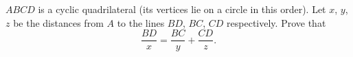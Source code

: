 $ABCD$ is a cyclic quadrilateral (its vertices lie on a circle in this order). Let $x$, $y$, $z$ be the distances from $A$ to the lines $BD$, $BC$, $CD$ respectively. Prove that
\[\dfrac{BD}{x}=\dfrac{BC}{y}+\dfrac{CD}{z}.\]
